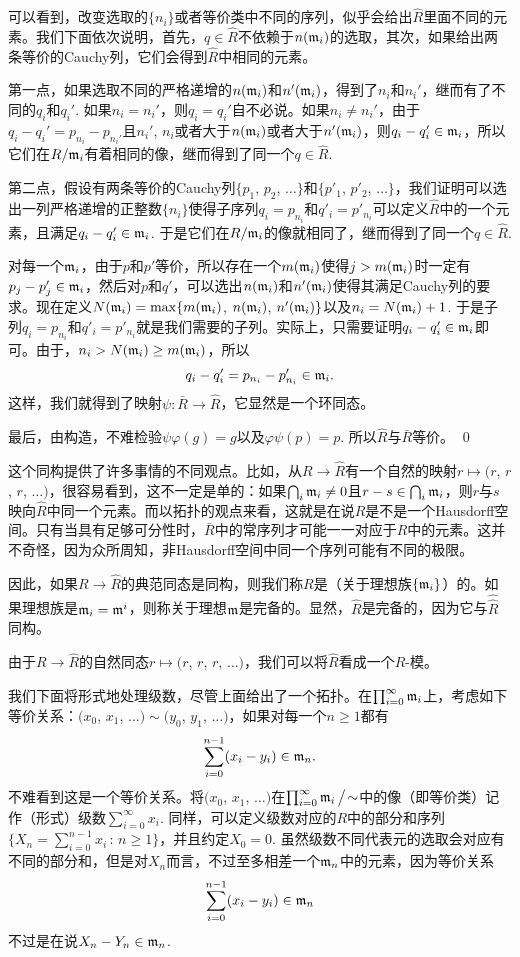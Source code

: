 	可以看到，改变选取的$\{n_i\}$或者等价类中不同的序列，似乎会给出$\hat R$里面不同的元素。我们下面依次说明，首先，$q\in \hat R$不依赖于$n(\mathfrak{m}_i)$的选取，其次，如果给出两条等价的Cauchy列，它们会得到$\hat R$中相同的元素。

	第一点，如果选取不同的严格递增的$n(\mathfrak{m}_i)$和$n'(\mathfrak{m}_i)$，得到了$n_i$和$n_i'$，继而有了不同的$q_i$和$q_i'$. 如果$n_i=n_i'$，则$q_i=q_i'$自不必说。如果$n_i\neq n_i'$，由于$q_i-q_i'=p_{n_i}-p_{n_i'}$且$n_i'$, $n_i$或者大于$n(\mathfrak{m}_i)$或者大于$n'(\mathfrak{m}_i)$，则$q_i-q_i'\in \mathfrak{m}_i$，所以它们在$R/\mathfrak{m}_i$有着相同的像，继而得到了同一个$q\in\hat R$.

	第二点，假设有两条等价的Cauchy列$\{p_1$, $p_2$, $\dots\}$和$\{p'_1$, $p'_2$, $\dots\}$，我们证明可以选出一列严格递增的正整数$\{n_i\}$使得子序列$q_i=p_{n_i}$和$q'_i=p'_{n_i}$可以定义$\hat R$中的一个元素，且满足$q_i-q_i'\in \mathfrak{m}_i$. 于是它们在$R/\mathfrak{m}_i$的像就相同了，继而得到了同一个$q\in\hat R$.

	对每一个$\mathfrak{m}_i$，由于$p$和$p'$等价，所以存在一个$m(\mathfrak{m}_i)$使得$j>m(\mathfrak{m}_i)$时一定有$p_j-p'_j\in \mathfrak{m}_i$，然后对$p$和$q'$，可以选出$n(\mathfrak{m}_i)$和$n'(\mathfrak{m}_i)$使得其满足Cauchy列的要求。现在定义$N(\mathfrak{m}_i)=\max\{m(\mathfrak{m}_i)$, $n(\mathfrak{m}_i)$, $n'(\mathfrak{m}_i)\}$以及$n_i=N(\mathfrak{m}_i)+1$. 于是子列$q_i=p_{n_i}$和$q'_i=p'_{n_i}$就是我们需要的子列。实际上，只需要证明$q_i-q_i'\in \mathfrak{m}_i$即可。由于，$n_i>N(\mathfrak{m}_i)\geq m(\mathfrak{m}_i)$，所以
	\[
		q_i-q'_i=p_{n_i}-p'_{n_i}\in \mathfrak{m}_i.
	\]
	这样，我们就得到了映射$\psi:\bar{R}\to \hat{R}$，它显然是一个环同态。

	最后，由构造，不难检验$\psi\varphi(g)=g$以及$\varphi\psi(p)=p$. 所以$\hat R$与$\bar R$等价。
\qed

这个同构提供了许多事情的不同观点。比如，从$R\to \hat R$有一个自然的映射$r\mapsto (r$, $r$, $r$, $\dots)$，很容易看到，这不一定是单的：如果$\bigcap_i \mathfrak{m}_i\neq 0$且$r-s\in \bigcap_i \mathfrak{m}_i$，则$r$与$s$映向$\hat R$中同一个元素。而以拓扑的观点来看，这就是在说$R$是不是一个Hausdorff空间。只有当具有足够可分性时，$\bar R$中的常序列才可能一一对应于$R$中的元素。这并不奇怪，因为众所周知，非Hausdorff空间中同一个序列可能有不同的极限。

因此，如果$R\to \hat R$的典范同态是同构，则我们称$R$是（关于理想族$\{\mathfrak{m}_i\}$）的。如果理想族是$\mathfrak{m}_i=\mathfrak{m}^i$，则称关于理想$\mathfrak{m}$是完备的。显然，$\hat R$是完备的，因为它与$\hat{\hat R}$同构。

由于$R\to \hat R$的自然同态$r\mapsto (r$, $r$, $r$, $\dots)$，我们可以将$\hat R$看成一个$R$-模。

\para 我们下面将形式地处理级数，尽管上面给出了一个拓扑。在$\prod_{i=0}^\infty \mathfrak{m}_i$上，考虑如下等价关系：$(x_0$, $x_1$, $\dots)\sim (y_0$, $y_1$, $\dots)$，如果对每一个$n\geq 1$都有
\[
	\sum_{i=0}^{n-1} (x_i-y_i)\in \mathfrak{m}_n.
\]
不难看到这是一个等价关系。将$(x_0$, $x_1$, $\dots)$在$\prod_{i=0}^\infty \mathfrak{m}_i\,\big/\!\sim$中的像（即等价类）记作（形式）级数$\sum_{i=0}^\infty x_i$. 同样，可以定义级数对应的$R$中的部分和序列$\{X_n=\sum_{i=0}^{n-1} x_i\,:\, n\geq 1\}$，并且约定$X_0=0$.  虽然级数不同代表元的选取会对应有不同的部分和，但是对$X_n$而言，不过至多相差一个$\mathfrak{m}_n$中的元素，因为等价关系
\[
	\sum_{i=0}^{n-1} (x_i-y_i)\in \mathfrak{m}_n
\]
不过是在说$X_n-Y_n\in \mathfrak{m}_n$. 

